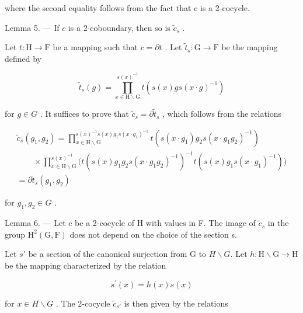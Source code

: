 where the second equality follows from the fact that c is a 2-cocycle.

Lemma 5. --- If \(c\) is a 2-coboundary, then so is \(\widetilde{c}_s\) .

Let \(t: \mathrm{H} \to \mathrm{F}\) be a mapping such that \(c = \partial t\) . Let \(\widetilde{t}_s: \mathrm{G} \to \mathrm{F}\) be the mapping defined by

\[
\widetilde {t} _ {s} (g) = \prod_ {x \in \mathrm{H} \backslash \mathrm{G}} ^ {s (x) ^ {- 1}} t (s (x) g s (x \cdot g) ^ {- 1})
\]

for \(g \in G\) . It suffices to prove that \(\widetilde{c}_{s} = \partial\widetilde{t}_{s}\) , which follows from the relations

\[
\begin{array}{l} \widetilde {c} _ {s} (g _ {1}, g _ {2}) = \prod_ {x \in \mathrm{H} \backslash \mathrm{G}} ^ {s (x) ^ {- 1} s (x) g _ {1} s (x \cdot g _ {1}) ^ {- 1}} t (s (x \cdot g _ {1}) g _ {2} s (x \cdot g _ {1} g _ {2}) ^ {- 1}) \\ \qquad \times \prod_ {x \in \mathrm{H} \backslash \mathrm{G}} ^ {s (x) ^ {- 1}} \big (t (s (x) g _ {1} g _ {2} s (x \cdot g _ {1} g _ {2}) ^ {- 1}) ^ {- 1} t (s (x) g _ {1} s (x \cdot g _ {1}) ^ {- 1}) \big) \\ = \partial \widetilde {t} _ {s} (g _ {1}, g _ {2}) \end{array}
\]

for \(g_{1}, g_{2} \in G\) .

Lemma 6. --- Let c be a 2-cocycle of H with values in F. The image of \(\widetilde{c}_{s}\) in the group \(\mathrm{H}^{2}(\mathrm{G},\mathrm{F})\) does not depend on the choice of the section s.

Let \(s'\) be a section of the canonical surjection from G to \(H\backslash G\). Let \(h: \mathrm{H} \backslash \mathrm{G} \to \mathrm{H}\) be the mapping characterized by the relation

\[
s ^ {\prime} (x) = h (x) s (x)
\]

for \(x \in H \backslash G\) . The 2-cocycle \(\widetilde{c}_{s'}\) is then given by the relations

